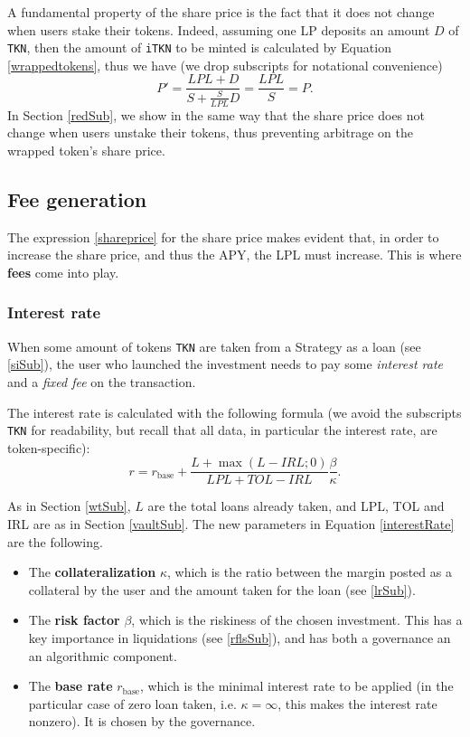 \documentclass[a4paper,10 pt]{article}
\theoremstyle{definition}
\begin{document}
A fundamental property of the share price is the fact that it does not change when users stake their tokens. Indeed, assuming one LP deposits an amount $D$ of \verb|TKN|, then the amount of \verb|iTKN| to be minted is calculated by Equation \eqref{wrappedtokens}, thus we have (we drop subscripts for notational convenience)
$$P' = \frac{LPL + D}{S + \frac{S}{LPL}D} = \frac{LPL}{S} = P.$$
In Section \ref{redSub}, we show in the same way that the share price does not change when users unstake their tokens, thus preventing arbitrage on the wrapped token's share price.

\subsection{Fee generation}\label{fgSub}
The expression \eqref{shareprice} for the share price makes evident that, in order to increase the share price, and thus the APY, the LPL must increase. This is where {\bf fees} come into play.

\subsubsection{Interest rate}\label{irSubSub}
When some amount of tokens \verb|TKN| are taken from a Strategy as a loan (see \ref{siSub}), the user who launched the investment needs to pay some {\it interest rate} and a {\it fixed fee} on the transaction. 

The interest rate is calculated with the following formula (we avoid the subscripts \verb|TKN| for readability, but recall that all data, in particular the interest rate, are token-specific):
\begin{equation}\label{interestRate}
r = r_{\text{base}} + \frac{L + \max(L-IRL;0)}{LPL+TOL-IRL}\frac{\beta}{\kappa}.
\end{equation}

As in Section \ref{wtSub}, $L$ are the total loans already taken, and LPL, TOL and IRL are as in Section \ref{vaultSub}. The new parameters in Equation \eqref{interestRate} are the following.
\begin{itemize}
\item The {\bf collateralization} $\kappa$, which is the ratio between the margin posted as a collateral by the user and the amount taken for the loan (see \ref{lrSub}).
\item The {\bf risk factor} $\beta$, which is the riskiness of the chosen investment. This has a key importance in liquidations (see \ref{rflsSub}), and has both a governance an an algorithmic component.
\item The {\bf base rate} $r_\text{base}$, which is the minimal interest rate to be applied (in the particular case of zero loan taken, i.e. $\kappa = \infty$, this makes the interest rate nonzero). It is chosen by the governance.
\end{itemize}
\end{document}
